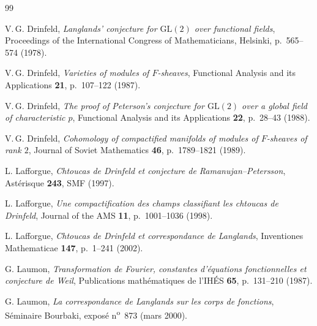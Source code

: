 
\begin{thebibliography}{99}

 V.\,G. Drinfeld, \emph{Langlands' conjecture for $\mathrm{GL}(2)$ over functional fields}, Proceedings of the International Congress of Mathematicians, Helsinki, p.~565--574 (1978).

 V.\,G. Drinfeld, \emph{Varieties of modules of $F$-sheaves}, Functional Analysis and its Applications \textbf{21}, p.~107--122 (1987).

 V.\,G. Drinfeld, \emph{The proof of Peterson's conjecture for $\mathrm{GL}(2)$ over a global field of characteristic $p$}, Functional Analysis and its Applications \textbf{22}, p.~28--43 (1988).

 V.\,G. Drinfeld, \emph{Cohomology of compactified manifolds of modules of $F$-sheaves of rank $2$}, Journal of Soviet Mathematics \textbf{46}, p.~1789--1821 (1989).

 L. Lafforgue, \emph{Chtoucas de Drinfeld et conjecture de Ramanujan--Petersson}, Astérisque \textbf{243}, SMF (1997).

 L. Lafforgue, \emph{Une compactification des champs classifiant les chtoucas de Drinfeld}, Journal of the AMS \textbf{11}, p.~1001--1036 (1998).

 L. Lafforgue, \emph{Chtoucas de Drinfeld et correspondance de Langlands}, Inventiones Mathematicae \textbf{147}, p.~1--241 (2002).

 G. Laumon, \emph{Transformation de Fourier, constantes d'équations fonctionnelles et conjecture de Weil}, Publications mathématiques de l'IHÉS \textbf{65}, p.~131--210 (1987).

 G. Laumon, \emph{La correspondance de Langlands sur les corps de fonctions}, Séminaire Bourbaki, exposé n\textsuperscript{o}~873 (mars 2000).

\end{thebibliography}
